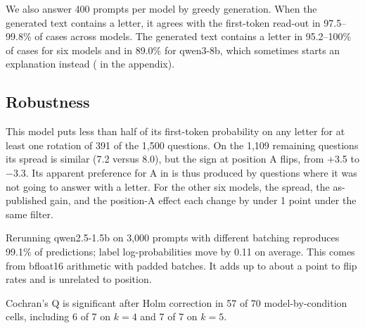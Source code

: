 We also answer 400 \mmlu prompts per model by greedy generation.
When the generated text contains a letter, it agrees with the first-token read-out in 97.5--99.8\% of cases across models.
The generated text contains a letter in 95.2--100\% of cases for six models and in 89.0\% for qwen3-8b, which sometimes starts an explanation instead ( in the appendix).

\subsection{Robustness}
\label{sec:robust}

This model puts less than half of its first-token probability on any letter for at least one rotation of 391 of the 1{,}500 questions.
On the 1{,}109 remaining questions its spread is similar (7.2 versus 8.0), but the sign at position A flips, from $+$3.5 to $-$3.3.
Its apparent preference for A in  is thus produced by questions where it was not going to answer with a letter.
For the other six models, the spread, the as-published gain, and the position-A effect each change by under 1 point under the same filter.

Rerunning qwen2.5-1.5b on 3{,}000 prompts with different batching reproduces 99.1\% of predictions; label log-probabilities move by 0.11 on average.
This comes from bfloat16 arithmetic with padded batches.
It adds up to about a point to flip rates and is unrelated to position.

Cochran's Q is significant after Holm correction in 57 of 70 model-by-condition cells, including 6 of 7 on \mmlu $k{=}4$ and 7 of 7 on \csqa $k{=}5$.
